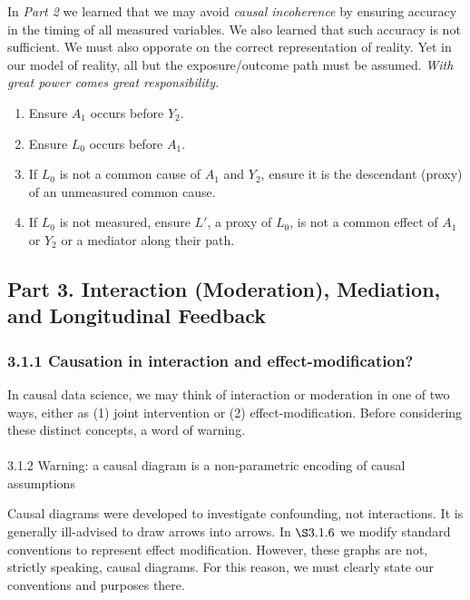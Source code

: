 \documentclass[
  singlecolumn]{article}
\makeatletter
\let\oldparagraph\paragraph
\renewcommand{\paragraph}{
    \@ifstar
      \xxxParagraphStar
      \xxxParagraphNoStar
  }
\newcommand{\xxxParagraphStar}[1]{\oldparagraph*{#1}\mbox{}}
\newcommand{\xxxParagraphNoStar}[1]{\oldparagraph{#1}\mbox{}}
\providecommand{\tightlist}{%
  \setlength{\itemsep}{0pt}\setlength{\parskip}{0pt}}\usepackage{longtable,booktabs,array}
\makeatother
\begin{document}
In \emph{Part 2} we learned that we may avoid \emph{causal incoherence}
by ensuring accuracy in the timing of all measured variables. We also
learned that such accuracy is not sufficient. We must also opporate on
the correct representation of reality. Yet in our model of reality, all
but the exposure/outcome path must be assumed. \emph{With great power
comes great responsibility.}

\begin{enumerate}
\def\labelenumi{\arabic{enumi}.}
\tightlist
\item
  Ensure \(A_1\) occurs before \(Y_2\).
\item
  Ensure \(L_0\) occurs before \(A_1\).
\item
  If \(L_0\) is not a common cause of \(A_1\) and \(Y_2\), ensure it is
  the descendant (proxy) of an unmeasured common cause.
\item
  If \(L_0\) is not measured, ensure \(L'\), a proxy of \(L_0\), is not
  a common effect of \(A_1\) or \(Y_2\) or a mediator along their path.
\end{enumerate}

\subsection{Part 3. Interaction (Moderation), Mediation, and
Longitudinal
Feedback}\label{part-3.-interaction-moderation-mediation-and-longitudinal-feedback}

\subsubsection{3.1.1 Causation in interaction and
effect-modification?}\label{causation-in-interaction-and-effect-modification}

In causal data science, we may think of interaction or moderation in one
of two ways, either as (1) joint intervention or (2)
effect-modification. Before considering these distinct concepts, a word
of warning.

\paragraph{3.1.2 Warning: a causal diagram is a non-parametric encoding
of causal
assumptions}\label{warning-a-causal-diagram-is-a-non-parametric-encoding-of-causal-assumptions}

Causal diagrams were developed to investigate confounding, not
interactions. It is generally ill-advised to draw arrows into arrows. In
\(\S 3.1.6\) we modify standard conventions to represent effect
modification. However, these graphs are not, strictly speaking, causal
diagrams. For this reason, we must clearly state our conventions and
purposes there.
\end{document}
